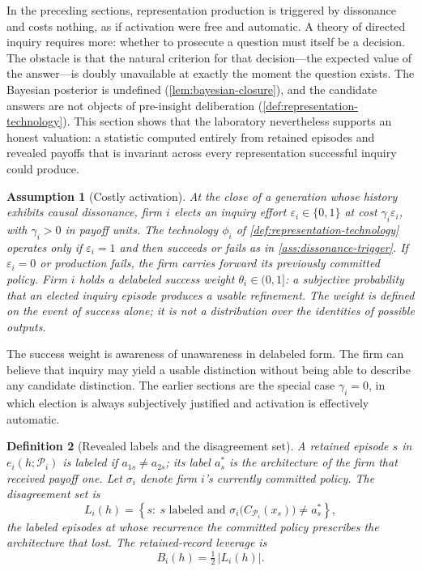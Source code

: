 \documentclass[11pt]{article}
\newtheorem{assumption}{Assumption}[section]
\newtheorem{definition}[assumption]{Definition}
\begin{document}
In the preceding sections, representation production is triggered by
dissonance and costs nothing, as if activation were free and automatic.  A
theory of directed inquiry requires more: whether to prosecute a question must
itself be a decision.  The obstacle is that the natural criterion for that
decision---the expected value of the answer---is doubly unavailable at exactly
the moment the question exists.  The Bayesian posterior is undefined
(\cref{lem:bayesian-closure}), and the candidate answers are not objects of
pre-insight deliberation (\cref{def:representation-technology}).  This section
shows that the laboratory nevertheless supports an honest valuation: a
statistic computed entirely from retained episodes and revealed payoffs that
is invariant across every representation successful inquiry could produce.

\begin{assumption}[Costly activation]
\label{ass:costly-activation}
At the close of a generation whose history exhibits causal dissonance, firm
$i$ elects an inquiry effort $\varepsilon_i\in\{0,1\}$ at cost
$\gamma_i\varepsilon_i$, with $\gamma_i>0$ in payoff units.  The technology
$\phi_i$ of \cref{def:representation-technology} operates only if
$\varepsilon_i=1$ and then succeeds or fails as in
\cref{ass:dissonance-trigger}.  If $\varepsilon_i=0$ or production fails, the
firm carries forward its previously committed policy.  Firm $i$ holds a
delabeled success weight $\theta_i\in(0,1]$: a subjective probability that an
elected inquiry episode produces a usable refinement.  The weight is defined
on the event of success alone; it is not a distribution over the identities of
possible outputs.
\end{assumption}

The success weight is awareness of unawareness in delabeled form.  The firm
can believe that inquiry may yield a usable distinction without being able to
describe any candidate distinction.  The earlier sections are the special case
$\gamma_i=0$, in which election is always subjectively justified and
activation is effectively automatic.

\begin{definition}[Revealed labels and the disagreement set]
\label{def:disagreement-set}
A retained episode $s$ in $e_i(h;\mathcal P_i)$ is \emph{labeled} if
$a_{1s}\neq a_{2s}$; its label $a^*_s$ is the architecture of the firm that
received payoff one.  Let $\sigma_i$ denote firm $i$'s currently committed
policy.  The \emph{disagreement set} is
\[
L_i(h)
=
\left\{
s:\ s\text{ labeled and }
\sigma_i\big(C_{\mathcal P_i}(x_s)\big)\neq a^*_s
\right\},
\]
the labeled episodes at whose recurrence the committed policy prescribes the
architecture that lost.  The \emph{retained-record leverage} is
\begin{equation}
B_i(h)=\tfrac12\,\bigl|L_i(h)\bigr|.
\label{eq:leverage}
\end{equation}
\end{definition}
\end{document}
